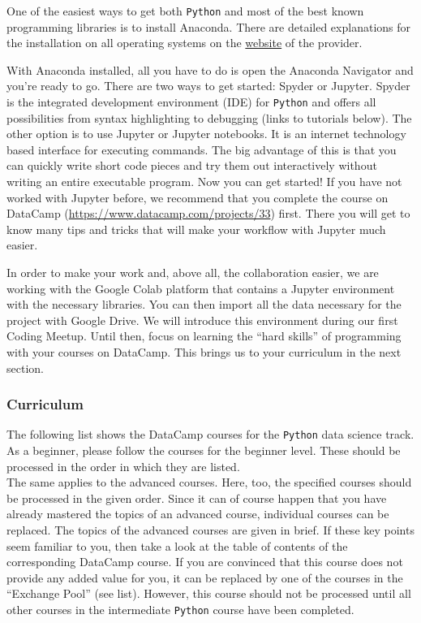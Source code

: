 \documentclass[
  11pt,
]{article}
\begin{document}
One of the easiest ways to get both \texttt{Python} and most of the best known programming libraries is to install Anaconda. There are detailed explanations for the installation on all operating systems on the \href{https://docs.anaconda.com/anaconda/install/}{website} of the provider.

With Anaconda installed, all you have to do is open the Anaconda Navigator and you're ready to go. There are two ways to get started: Spyder or Jupyter. Spyder is the integrated development environment (IDE) for \texttt{Python} and offers all possibilities from syntax highlighting to debugging (links to tutorials below). The other option is to use Jupyter or Jupyter notebooks. It is an internet technology based interface for executing commands. The big advantage of this is that you can quickly write short code pieces and try them out interactively without writing an entire executable program.
Now you can get started! If you have not worked with Jupyter before, we recommend that you complete the course on DataCamp (\url{https://www.datacamp.com/projects/33}) first. There you will get to know many tips and tricks that will make your workflow with Jupyter much easier.

In order to make your work and, above all, the collaboration easier, we are working with the Google Colab platform that contains a Jupyter environment with the necessary libraries. You can then import all the data necessary for the project with Google Drive. We will introduce this environment during our first Coding Meetup. Until then, focus on learning the ``hard skills'' of programming with your courses on DataCamp. This brings us to your curriculum in the next section.

\hypertarget{curriculum-1}{%
\subsubsection{Curriculum}\label{curriculum-1}}

The following list shows the DataCamp courses for the \texttt{Python} data science track. As a beginner, please follow the courses for the beginner level. These should be processed in the order in which they are listed.\\
The same applies to the advanced courses. Here, too, the specified courses should be processed in the given order. Since it can of course happen that you have already mastered the topics of an advanced course, individual courses can be replaced. The topics of the advanced courses are given in brief. If these key points seem familiar to you, then take a look at the table of contents of the corresponding DataCamp course.
If you are convinced that this course does not provide any added value for you, it can be replaced by one of the courses in the ``Exchange Pool'' (see list). However, this course should not be processed until all other courses in the intermediate \texttt{Python} course have been completed.
\end{document}
